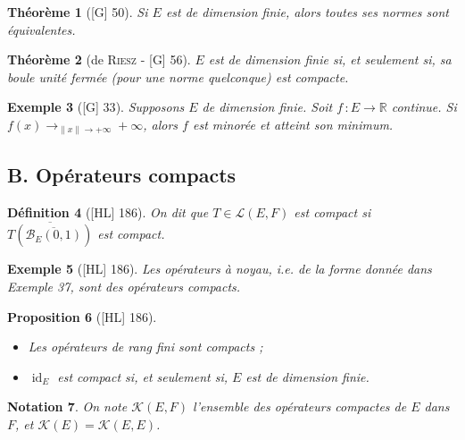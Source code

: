 \documentclass[10pt, a4paper, parskip=full, twoside, twocolumn]{report}
\newtheorem{definition}{Définition}
\newtheorem{theorem}[definition]{Théorème}
\newtheorem{proposition}[definition]{Proposition}
\newtheorem{example}[definition]{Exemple}
\newtheorem{notation}[definition]{Notation}
\newcommand{\IR}{\mathbb{R}}
\newcommand{\B}{\mathcal{B}}
\DeclareMathOperator{\id}{id}
\begin{document}
\begin{tcolorbox}[
    breakable, %
    colback=developpement, %
    colframe=gray!0!black, %
    boxrule=0pt, %
    arc=1mm, %
	boxsep=0pt,
	left=0pt, right=0pt, top=0pt, bottom=0pt
]
\begin{theorem}[\textnormal{[G] 50}]
	\label{203dev21}
	Si $E$ est de dimension finie, alors toutes ses normes sont équivalentes.
\end{theorem}
\begin{theorem}[de \textsc{Riesz} - \textnormal{[G] 56}]
	\label{203dev22}
	$E$ est de dimension finie si, et seulement si, sa boule unité fermée (pour une norme quelconque) est compacte.
\end{theorem}
\end{tcolorbox}

\begin{example}[\textnormal{[G] 33}]
	Supposons $E$ de dimension finie. Soit $f\,\colon E\to \IR$ continue.
	Si $f(x) \to_{\|x\|\to +\infty}+\infty$, alors $f$ est minorée et atteint son minimum.
\end{example}

\subsection*{B. Opérateurs compacts}
\begin{definition}[\textnormal{[HL] 186}]
	On dit que $T\in\mathcal{L}(E,F)$ est \emph{compact} si $\overline{T(\overline{\B_E(0,1)})}$ est compact.
\end{definition}

\begin{example}[\textnormal{[HL] 186}]
	Les opérateurs à noyau, \emph{i.e.} de la forme donnée dans Exemple 37, sont des opérateurs compacts.
\end{example}

\begin{proposition}[\textnormal{[HL] 186}]
	\begin{itemize}
		\item Les opérateurs de rang fini sont compacts ;
		\item $\id_E$ est compact si, et seulement si, $E$ est de dimension finie.
	\end{itemize}
\end{proposition}

\begin{notation}
	On note $\mathcal{K}(E,F)$ l'ensemble des opérateurs compactes de $E$ dans $F$, et $\mathcal{K}(E) = \mathcal{K}(E,E)$.
\end{notation}
\end{document}
